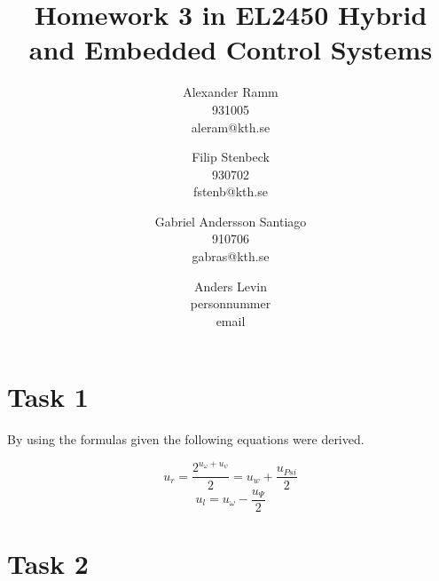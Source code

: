 \documentclass[a4paper,12pt,oneside,onecolumn]{article} %
\begin{document}

\title{Homework 3 in EL2450 Hybrid and Embedded Control Systems}
\author{
  Alexander Ramm \\ 931005 \\ aleram@kth.se 
  \and 
  Filip Stenbeck \\ 930702 \\ fstenb@kth.se
  \and
  Gabriel Andersson Santiago \\ 910706 \\ gabras@kth.se
  \and
  Anders Levin \\ personnummer \\ email
  \and
  }

\maketitle                     %
\newpage







\section*{Task 1}

By using the formulas given the following equations were derived.

\begin{equation}
u_r = \frac{2^{u_{\omega} + u_{\psi}}}{2} = u_w + \frac{u_{Psi}}{2}
\end{equation}
\begin{equation}
u_l = u_\omega - \frac{u_\Psi}{2}
\end{equation}

\section*{Task 2}
\end{document}
